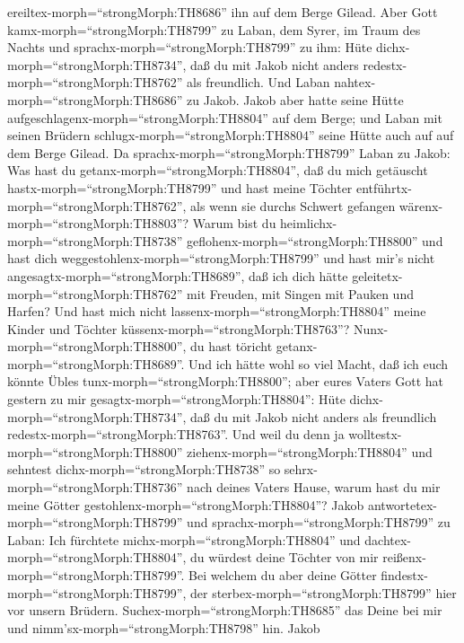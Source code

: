 ereiltex-morph=``strongMorph:TH8686'' ihn auf dem Berge Gilead.
 Aber Gott kamx-morph=``strongMorph:TH8799'' zu Laban, dem
Syrer, im Traum des Nachts und sprachx-morph=``strongMorph:TH8799'' zu
ihm: Hüte dichx-morph=``strongMorph:TH8734'', daß du mit Jakob nicht
anders redestx-morph=``strongMorph:TH8762'' als freundlich.
 Und Laban nahtex-morph=``strongMorph:TH8686'' zu Jakob.
Jakob aber hatte seine Hütte aufgeschlagenx-morph=``strongMorph:TH8804''
auf dem Berge; und Laban mit seinen Brüdern
schlugx-morph=``strongMorph:TH8804'' seine Hütte auch auf auf dem Berge
Gilead.  Da sprachx-morph=``strongMorph:TH8799'' Laban zu
Jakob: Was hast du getanx-morph=``strongMorph:TH8804'', daß du mich
getäuscht hastx-morph=``strongMorph:TH8799'' und hast meine Töchter
entführtx-morph=``strongMorph:TH8762'', als wenn sie durchs Schwert
gefangen wärenx-morph=``strongMorph:TH8803''?  Warum bist
du heimlichx-morph=``strongMorph:TH8738''
geflohenx-morph=``strongMorph:TH8800'' und hast dich
weggestohlenx-morph=``strongMorph:TH8799'' und hast mir's nicht
angesagtx-morph=``strongMorph:TH8689'', daß ich dich hätte
geleitetx-morph=``strongMorph:TH8762'' mit Freuden, mit Singen mit
Pauken und Harfen?  Und hast mich nicht
lassenx-morph=``strongMorph:TH8804'' meine Kinder und Töchter
küssenx-morph=``strongMorph:TH8763''? Nunx-morph=``strongMorph:TH8800'',
du hast töricht getanx-morph=``strongMorph:TH8689''.  Und
ich hätte wohl so viel Macht, daß ich euch könnte Übles
tunx-morph=``strongMorph:TH8800''; aber eures Vaters Gott hat gestern zu
mir gesagtx-morph=``strongMorph:TH8804'': Hüte
dichx-morph=``strongMorph:TH8734'', daß du mit Jakob nicht anders als
freundlich redestx-morph=``strongMorph:TH8763''.  Und weil
du denn ja wolltestx-morph=``strongMorph:TH8800''
ziehenx-morph=``strongMorph:TH8804'' und sehntest
dichx-morph=``strongMorph:TH8738'' so sehrx-morph=``strongMorph:TH8736''
nach deines Vaters Hause, warum hast du mir meine Götter
gestohlenx-morph=``strongMorph:TH8804''?  Jakob
antwortetex-morph=``strongMorph:TH8799'' und
sprachx-morph=``strongMorph:TH8799'' zu Laban: Ich fürchtete
michx-morph=``strongMorph:TH8804'' und
dachtex-morph=``strongMorph:TH8804'', du würdest deine Töchter von mir
reißenx-morph=``strongMorph:TH8799''.  Bei welchem du aber
deine Götter findestx-morph=``strongMorph:TH8799'', der
sterbex-morph=``strongMorph:TH8799'' hier vor unsern Brüdern.
Suchex-morph=``strongMorph:TH8685'' das Deine bei mir und
nimm'sx-morph=``strongMorph:TH8798'' hin. Jakob
